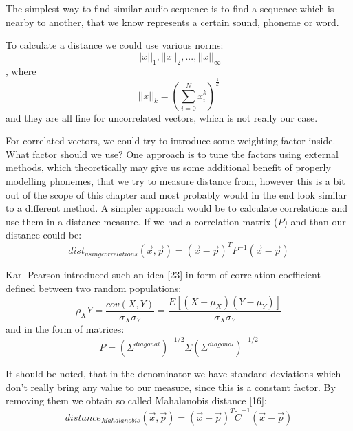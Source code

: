 \documentclass[12pt,a4paper,english]{article}
\begin{document}
The simplest way to find similar audio sequence is to find a sequence which is nearby to another,
that we know represents a certain sound, phoneme or word. \newline

To calculate a distance we could use various norms:
\begin{equation}
    ||x||_1 , || x ||_2, ... , || x ||_\infty
\end{equation}
, where 
\begin{equation}
    ||x||_k = (\sum_{i=0}^{N} x_i^k)^\frac{1}{k}
\end{equation}
and they are all fine for uncorrelated vectors, which is not really our case. \newline


For correlated vectors, we could try to introduce some weighting factor inside.\newline
What factor should we use?\newline
One approach is to tune the factors using external methods, which theoretically may give us some additional benefit of properly modelling phonemes, that we try to measure distance from, however this is a bit out of the scope of this chapter and most probably would in the end look similar to a different method.
A simpler approach would be to calculate correlations and use them in a distance measure.
If we had a correlation matrix ($P$) and than our distance could be:
\begin{equation}
    dist_{using correlations}(\vec x, \vec p) = (\vec x - \vec p)^T P^{-1} (\vec x - \vec p)
\end{equation}
               
Karl Pearson introduced such an idea [23] in form of correlation coefficient defined between two random populations:  
\begin{equation}
    \rho_XY = \frac{cov(X, Y)}{\sigma_X \sigma_Y} = \frac{E[(X - \mu_X)(Y - \mu_Y)]}{\sigma_X \sigma_Y}
\end{equation}
and in the form of matrices:  
\begin{equation}
    P = (\Sigma^{diagonal})^{-1/2} \Sigma (\Sigma^{diagonal})^{-1/2}
\end{equation}

It should be noted, that in the denominator we have standard deviations which don't really bring any value to our measure, since this is a constant factor.
By removing them we obtain so called Mahalanobis distance [16]:
\begin{equation}
    distance_{Mahalanobis}(\vec x, \vec p) = (\vec x - \vec p)^T \tilde C^{-1} (\vec x - \vec p)
\end{equation}
\end{document}

